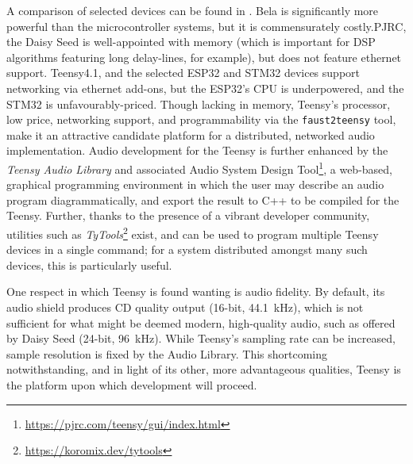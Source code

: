 A comparison of selected devices can be found in
.
Bela is significantly more powerful than the microcontroller systems, but it is
commensurately costly.PJRC, the
Daisy Seed is well-appointed with memory (which is important for DSP algorithms
featuring long delay-lines, for example), but does not feature ethernet support.
Teensy4.1, and the selected ESP32 and STM32 devices support networking via
ethernet add-ons, but the ESP32's CPU is underpowered, and the STM32 is
unfavourably-priced.
Though lacking in memory, Teensy's processor, low price, networking support, and
programmability via the \texttt{faust2teensy} tool, make it an attractive
candidate platform for a distributed, networked audio implementation.
Audio development for the Teensy is further enhanced by the \textit{Teensy
Audio Library} and associated Audio System Design Tool\footnote{
    \url{https://pjrc.com/teensy/gui/index.html}
}, a web-based, graphical programming environment in which the user may describe
an audio program diagrammatically, and export the result to C++ to be compiled
for the Teensy.
Further, thanks to the presence of a vibrant developer community, utilities such
as \textit{TyTools}\footnote{\url{https://koromix.dev/tytools}} exist, and can
be used to program multiple Teensy devices in a single command;
for a system distributed amongst many such devices, this is particularly useful.

One respect in which Teensy is found wanting is audio fidelity.
By default, its audio shield produces CD quality output (16-bit,
\qty{44.1}{\kHz}), which is not sufficient for what might be deemed modern,
high-quality audio, such as offered by Daisy Seed (24-bit, \qty{96}{\kHz}).
While Teensy's sampling rate can be increased, sample resolution is fixed by
the Audio Library.
This shortcoming notwithstanding, and in light of its other, more advantageous
qualities, Teensy is the platform upon which development will proceed.

